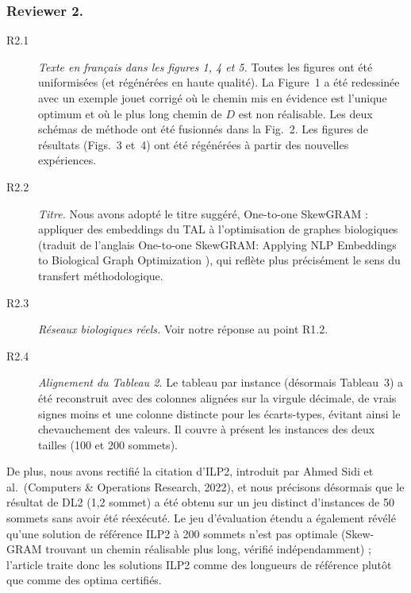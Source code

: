 \subsubsection{Reviewer 2.}

\begin{description}
\item[R2.1] \emph{Texte en français dans les figures 1, 4 et 5.} Toutes les figures ont été uniformisées (et régénérées en haute qualité). La Figure~1 a été redessinée avec un exemple jouet corrigé où le chemin mis en évidence est l'unique optimum et où le plus long chemin de $D$ est non réalisable. Les deux schémas de méthode ont été fusionnés dans la Fig.~2. Les figures de résultats (Figs.~3 et~4) ont été régénérées à partir des nouvelles expériences.

\item[R2.2] \emph{Titre.} Nous avons adopté le titre suggéré, \og One-to-one SkewGRAM : appliquer des embeddings du TAL à l'optimisation de graphes biologiques \fg{} (traduit de l'anglais \og One-to-one SkewGRAM: Applying NLP Embeddings to Biological Graph Optimization \fg), qui reflète plus précisément le sens du transfert méthodologique.

\item[R2.3] \emph{Réseaux biologiques réels.} Voir notre réponse au point R1.2.

\item[R2.4] \emph{Alignement du Tableau 2.} Le tableau par instance (désormais Tableau~3) a été reconstruit avec des colonnes alignées sur la virgule décimale, de vrais signes moins et une colonne distincte pour les écarts-types, évitant ainsi le chevauchement des valeurs. Il couvre à présent les instances des deux tailles (100 et 200 sommets).
\end{description}

De plus, nous avons rectifié la citation d'ILP2, introduit par Ahmed Sidi et al.\ (Computers \& Operations Research, 2022), et nous précisons désormais que le résultat de DL2 (1,2 sommet) a été obtenu sur un jeu distinct d'instances de 50 sommets sans avoir été réexécuté. Le jeu d'évaluation étendu a également révélé qu'une solution de référence ILP2 à 200 sommets n'est pas optimale (Skew-GRAM trouvant un chemin réalisable plus long, vérifié indépendamment) ; l'article traite donc les solutions ILP2 comme des longueurs de référence plutôt que comme des optima certifiés.
